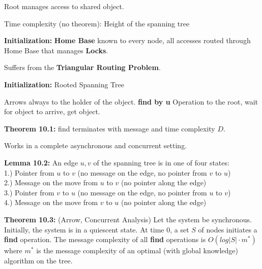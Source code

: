 
{
	\begin{items}
		\item Root manages access to shared object.
		\item Time complexity (no theorem): Height of the spanning tree
	\end{items}
}

{
	\begin{items}
		\item {\bf Initialization:} {\bf Home Base} known to every node, all accesses routed through Home Base that manages {\bf Locks}.
		\item Suffers from the {\bf Triangular Routing Problem}.
	\end{items}
}

{
	\begin{items}
		\item {\bf Initialization:} Rooted Spanning Tree
		\item Arrows always to the holder of the object. {\bf find by u} Operation to the root, wait for object to arrive, get object.
		\item {\bf Theorem 10.1:} find terminates with message and time complexity $D$.
		\item Works in a complete asynchronous and concurrent setting.
		\item {\bf Lemma 10.2:} An edge ${u, v}$ of the spanning tree is in one of four states:\\
			1.) Pointer from $u$ to $v$ (no message on the edge, no pointer from $v$ to $u$)\\
			2.) Message on the move from $u$ to $v$ (no pointer along the edge)\\
			3.) Pointer from $v$ to $u$ (no message on the edge, no pointer from $u$ to $v$)\\
			4.) Message on the move from $v$ to $u$ (no pointer along the edge)
		\item {\bf Theorem 10.3:} (Arrow, Concurrent Analysis) Let the system be synchronous. 
			Initially, the system is in a quiescent state. At time $0$, a set $S$ of nodes initiates 
			a {\bf find} operation. The message complexity of all {\bf find} operations is $O(log |S|\cdot m^{*})$ 
			where $m^{*}$ is the message complexity of an optimal (with global knowledge) algorithm on the tree.
	\end{items}
}

